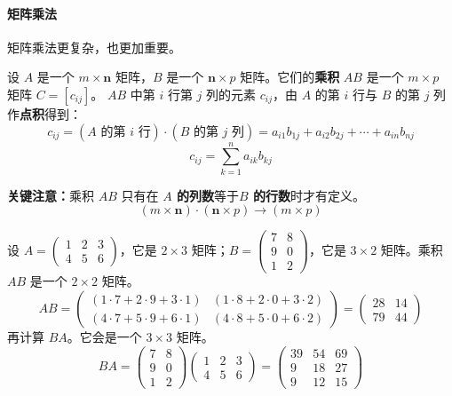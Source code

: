 \paragraph{矩阵乘法}
矩阵乘法更复杂，也更加重要。

\begin{definition}[矩阵乘法]
设 $A$ 是一个 $m\times \mathbf{n}$ 矩阵，$B$ 是一个 $\mathbf{n}\times p$ 矩阵。它们的\textbf{乘积} $AB$ 是一个 $m\times p$ 矩阵 $C=[c_{ij}]$。
$AB$ 中第 $i$ 行第 $j$ 列的元素 $c_{ij}$，由 $A$ 的第 $i$ 行与 $B$ 的第 $j$ 列作\textbf{点积}得到：
\[ c_{ij} = (A\text{ 的第 }i\text{ 行})\cdot (B\text{ 的第 }j\text{ 列}) = a_{i1}b_{1j}+a_{i2}b_{2j}+\cdots+a_{in}b_{nj} \]
\[ c_{ij}=\sum_{k=1}^{n} a_{ik}b_{kj} \]
\end{definition}

\textbf{关键注意：}乘积 $AB$ 只有在 \textbf{$A$ 的列数}等于\textbf{$B$ 的行数}时才有定义。
\[
(m\times \mathbf{n})\cdot(\mathbf{n}\times p)\to(m\times p)
\]

\begin{example}
设 $A=\begin{pmatrix}1&2&3\\4&5&6\end{pmatrix}$，它是 $2\times3$ 矩阵；$B=\begin{pmatrix}7&8\\9&0\\1&2\end{pmatrix}$，它是 $3\times2$ 矩阵。乘积 $AB$ 是一个 $2\times2$ 矩阵。
\[
AB = \begin{pmatrix}
(1\cdot 7 + 2\cdot 9 + 3\cdot 1) & (1\cdot 8 + 2\cdot 0 + 3\cdot 2) \\
(4\cdot 7 + 5\cdot 9 + 6\cdot 1) & (4\cdot 8 + 5\cdot 0 + 6\cdot 2)
\end{pmatrix}
= \begin{pmatrix} 28 & 14 \\ 79 & 44 \end{pmatrix}
\]
再计算 $BA$。它会是一个 $3\times3$ 矩阵。
\[
BA = \begin{pmatrix} 7 & 8 \\ 9 & 0 \\ 1 & 2 \end{pmatrix} \begin{pmatrix} 1 & 2 & 3 \\ 4 & 5 & 6 \end{pmatrix}
= \begin{pmatrix}
39 & 54 & 69 \\
9 & 18 & 27 \\
9 & 12 & 15
\end{pmatrix}
\]
\end{example}

